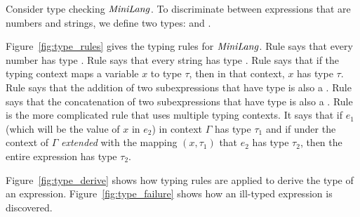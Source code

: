 Consider type checking $\mathit{MiniLang}$.
To discriminate between expressions that are numbers and
strings, we define two types:  and .

Figure~\ref{fig:type_rules} gives the typing rules for $\mathit{MiniLang}$.
Rule  says that every number has type .
Rule  says that every string has type .
Rule  says that if the typing context maps
a variable $x$ to type $\tau$, then in that context, $x$ has type
$\tau$.
Rule  says that the addition of two subexpressions that
have type  is also a .
Rule  says that the concatenation of two subexpressions that
have type  is also a .
Rule  is the more complicated rule that uses 
multiple typing contexts.
It says that if $e_1$ (which will be the value of $x$ in $e_2$)
in context $\Gamma$ has type $\tau_1$ and if under the context of
$\Gamma$ \emph{extended} with the mapping $(x, \tau_1)$ that
$e_2$ has type $\tau_2$, then the entire  expression has
type $\tau_2$.


Figure~\ref{fig:type_derive} shows how typing rules are
applied to derive the type of an expression.
Figure~\ref{fig:type_failure} shows how an ill-typed
expression is discovered.





